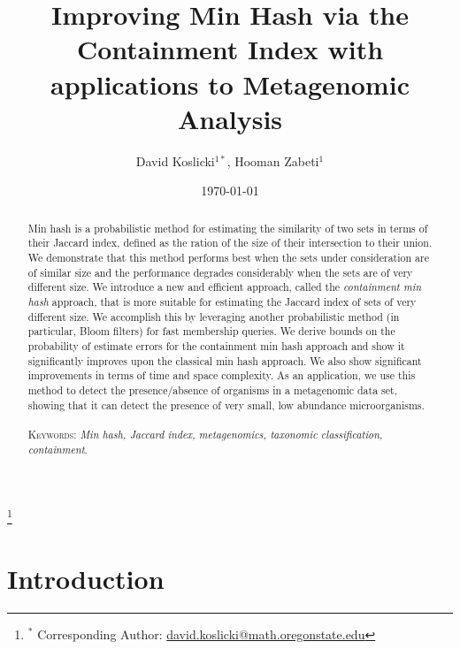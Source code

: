 \documentclass[11pt,reqno]{amsart}
\theoremstyle{remark}
\numberwithin{equation}{section}
\begin{document}
\title[Improving Min Hash]{Improving Min Hash via the Containment Index with applications to Metagenomic Analysis} %


\author{David Koslicki${}^{1*}$, Hooman Zabeti${}^{1}$}
\address{${}^1$ Mathematics Department, Oregon State University, Corvallis, OR.}
\thanks{${}^*$ Corresponding Author: \url{david.koslicki@math.oregonstate.edu}}





\date{\today}
\begin{abstract}
Min hash is a probabilistic method for estimating the similarity of two sets in terms of their Jaccard index, defined as the ration of the size of their intersection to their union. We demonstrate that this method performs best when the sets under consideration are of similar size and the performance degrades considerably when the sets are of very different size. We introduce a new and efficient approach, called the \textit{containment min hash} approach, that is more suitable for estimating the Jaccard index of sets of very different size. We accomplish this by leveraging another probabilistic method (in particular, Bloom filters) for fast membership queries. We derive bounds on the probability of estimate errors for the containment min hash approach and show it significantly improves upon the classical min hash approach. We also show significant improvements in terms of time and space complexity. As an application, we use this method to detect the presence/absence of organisms in a metagenomic data set, showing that it can detect the presence of very small, low abundance microorganisms.  \\\\
\smallskip
\noindent \textsc{Keywords}: \emph{Min hash, Jaccard index, metagenomics, taxonomic classification, containment}.
\end{abstract}
\maketitle


\section{Introduction}
\end{document}
